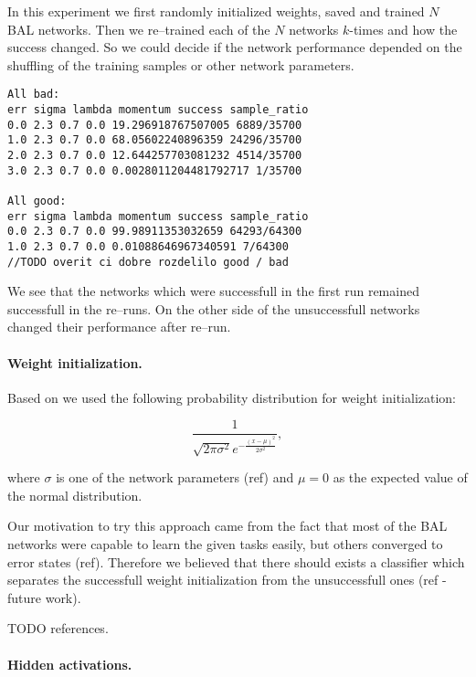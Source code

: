 In this experiment we first randomly initialized weights, saved and trained $N$ BAL networks. Then we re--trained each of the $N$ networks $k$-times and how the success changed. So we could decide if the network performance depended on the shuffling of the training samples or other network parameters. 

\begin{lstlisting}
All bad: 
err sigma lambda momentum success sample_ratio
0.0 2.3 0.7 0.0 19.296918767507005 6889/35700
1.0 2.3 0.7 0.0 68.05602240896359 24296/35700
2.0 2.3 0.7 0.0 12.644257703081232 4514/35700
3.0 2.3 0.7 0.0 0.0028011204481792717 1/35700

All good: 
err sigma lambda momentum success sample_ratio
0.0 2.3 0.7 0.0 99.98911353032659 64293/64300
1.0 2.3 0.7 0.0 0.01088646967340591 7/64300
//TODO overit ci dobre rozdelilo good / bad
\end{lstlisting}

We see that the networks which were successfull in the first run remained successfull in the re--runs. On the other side of the unsuccessfull networks changed their performance after re--run. 

\paragraph{Weight initialization.} 

Based on \citet{o1996bio} we used the following probability distribution for weight initialization: 

\begin{equation} 
\frac{1}{\sqrt{2\pi \sigma^2} e^{-\frac{(x-\mu)^2}{2\sigma^2}}},
\end{equation} 

where $\sigma$ is one of the network parameters (ref) and $\mu = 0$ as the expected value of the normal distribution. 

Our motivation to try this approach came from the fact that most of the BAL networks were capable to learn the given tasks easily, but others converged to error states (ref). Therefore we believed that there should exists a classifier which separates the successfull weight initialization from the unsuccessfull ones (ref - future work). 

TODO references.  

\paragraph{Hidden activations.}

